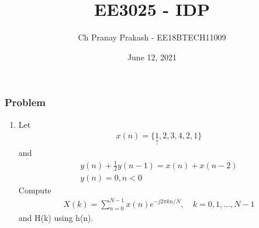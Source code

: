 \documentclass{beamer}
\title[]{EE3025 - IDP}
\author{Ch Pranay Prakash - EE18BTECH11009 }
\date{June 12, 2021}
\begin{document}
\begin{frame}
\titlepage 
\end{frame}

\begin{frame}
\frametitle{Problem}
\begin{enumerate}

    \item Let
    \begin{align}
        x(n) = \{{\underset{\uparrow}{1},2,3,4,2,1}\}
    \end{align}
    and 
    \begin{align}
        y(n) + \frac{1}{2}y(n-1) = x(n) + x(n-2) \\
        y(n) = 0 , n<0
        \label{eq:1.0.2}
    \end{align}
    Compute
    \begin{align}
        X(k) = \sum_{n=0}^{N-1}x(n)e^{-j2\pi kn/N},
        \quad k=0,1, \ldots, N-1
    \end{align}
    and H(k) using h(n).
\end{enumerate}
\end{frame}
\end{document}
